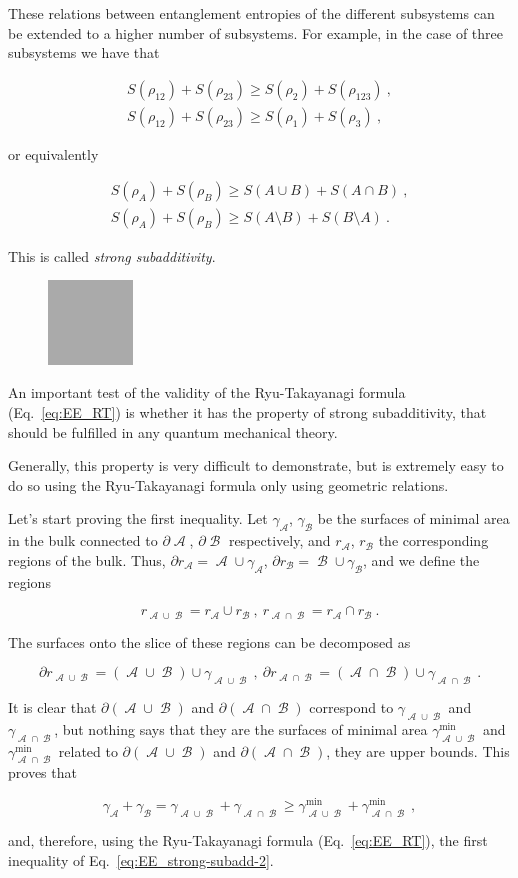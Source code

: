 \documentclass[twocolumn]{revtex4}
\providecommand{\eq}[2]{
    \begin{equation}
        #2
    \label{eq:#1}
    \end{equation}
}
\providecommand{\eqgat}[2]{
    \begin{gather}
        #2
    \label{eq:#1}
    \end{gather}
}
\DeclareMathOperator{\calA}{\mathcal{A}}
\DeclareMathOperator{\calB}{\mathcal{B}}
\begin{document}
These relations between entanglement entropies of the different subsystems can be extended to a higher number of subsystems. For example, in the case of three subsystems we have that
\eqgat{EE_strong-subadd}{
    S(\rho_{12}) + S(\rho_{23}) \ge S(\rho_2) + S(\rho_{123}) \ , \nonumber \\
    S(\rho_{12}) + S(\rho_{23}) \ge S(\rho_1) + S(\rho_3) \ ,
}
or equivalently
\eqgat{EE_strong-subadd-2}{
    S(\rho_{A}) + S(\rho_{B}) \ge S(A \cup B) + S(A \cap B) \ , \nonumber \\
    S(\rho_{A}) + S(\rho_{B}) \ge S(A \setminus B) + S(B \setminus A) \ .
}
This is called \textit{strong subadditivity}.

\begin{figure}
    \centering
    \includegraphics[width=0.2\textwidth]{../Imatges/empty.png}
\label{fig:}
\caption{}
\end{figure}

An important test of the validity of the Ryu-Takayanagi formula (Eq.~\ref{eq:EE_RT}) is whether it has the property of strong subadditivity, that should be fulfilled in any quantum mechanical theory.

Generally, this property is very difficult to demonstrate, but is extremely easy to do so using the Ryu-Takayanagi formula only using geometric relations.

Let's start proving the first inequality. Let $\gamma_{\calA}$, $\gamma_{\calB}$ be the surfaces of minimal area in the bulk connected to $\partial \calA$, $\partial \calB$ respectively, and $r_{\calA}$, $r_{\calB}$ the corresponding regions of the bulk. Thus, $\partial r_{\calA} = \calA \cup \gamma_{\calA}$, $\partial r_{\calB} = \calB \cup \gamma_{\calB}$, and we define the regions
\eq{SS_r-1}{
    r_{\calA \cup \calB} = r_{\calA} \cup r_{\calB} \ , \ r_{\calA \cap \calB} = r_{\calA} \cap r_{\calB} \ .
}
The surfaces onto the slice of these regions can be decomposed as
\eq{SS_dr-1}{
    \partial r_{\calA \cup \calB} = (\calA \cup \calB) \cup \gamma_{\calA \cup \calB} \ , \ \partial r_{\calA \cap \calB } = (\calA \cap \calB) \cup \gamma_{\calA \cap \calB} \ .
    }
It is clear that $\partial (\calA \cup \calB)$ and $\partial (\calA \cap \calB)$ correspond to $\gamma_{\calA \cup \calB}$ and $\gamma_{\calA \cap \calB}$, but nothing says that they are the surfaces of minimal area $\gamma^{\text{min}}_{\calA \cup \calB}$ and $\gamma^{\text{min}}_{\calA \cap \calB}$ related to $\partial (\calA \cup \calB)$ and $\partial (\calA \cap \calB)$, they are upper bounds. This proves that
\eq{SS_gamma-1}{
    \gamma_{\calA} + \gamma_{\calB} = \gamma_{\calA \cup \calB} + \gamma_{\calA \cap \calB} \ge \gamma^{\text{min}}_{\calA \cup \calB} + \gamma^{\text{min}}_{\calA \cap \calB} \ ,
}
and, therefore, using the Ryu-Takayanagi formula (Eq.~\ref{eq:EE_RT}), the first inequality of Eq.~\ref{eq:EE_strong-subadd-2}.
\end{document}
